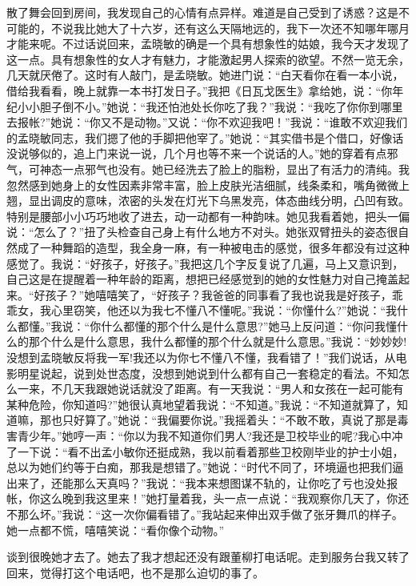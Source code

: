 \documentclass[12pt,oneside]{book}
\begin{document}
散了舞会回到房间，我发现自己的心情有点异样。难道是自己受到了诱惑？这是不可能的，不说我比她大了十六岁，还有这么天隔地远的，我下一次还不知哪年哪月才能来呢。不过话说回来，孟晓敏的确是一个具有想象性的姑娘，我今天才发现了这一点。具有想象性的女人才有魅力，才能激起男人探索的欲望。不然一览无余，几天就厌倦了。这时有人敲门，是孟晓敏。她进门说：``白天看你在看一本小说，借给我看看，晚上就靠一本书打发日子。''我把《日瓦戈医生》拿给她，说：``你年纪小小胆子倒不小。''她说：``我还怕池处长你吃了我？''我说：``我吃了你你到哪里去报帐?''她说：``你又不是动物。''又说：``你不欢迎我吧！''我说：``谁敢不欢迎我们的孟晓敏同志，我们摁了他的手脚把他宰了。''她说：``其实借书是个借口，好像话没说够似的，追上门来说一说，几个月也等不来一个说话的人。''她的穿着有点邪气，可神态一点邪气也没有。她已经洗去了脸上的脂粉，显出了有活力的清纯。我忽然感到她身上的女性因素非常丰富，脸上皮肤光洁细腻，线条柔和，嘴角微微上翘，显出调皮的意味，浓密的头发在灯光下乌黑发亮，体态曲线分明，凸凹有致。特别是腰部小小巧巧地收了进去，动一动都有一种韵味。她见我看着她，把头一偏说：``怎么了？''扭了头检查自己身上有什么地方不对头。她张双臂扭头的姿态很自然成了一种舞蹈的造型，我全身一麻，有一种被电击的感觉，很多年都没有过这种感觉了。我说：``好孩子，好孩子。''我把这几个字反复说了几遍，马上又意识到，自己这是在提醒着一种年龄的距离，想把已经感觉到的她的女性魅力对自己掩盖起来。``好孩子？''她嘻嘻笑了，``好孩子？我爸爸的同事看了我也说我是好孩子，乖乖女，我心里窃笑，他还以为我七不懂八不懂呢。''我说：``你懂什么?''她说：``我什么都懂。''我说：``你什么都懂的那个什么是什么意思?''她马上反问道：``你问我懂什么的那个什么是什么意思，我什么都懂的那个什么就是什么意思。''我说：``妙妙妙!没想到孟晓敏反将我一军!我还以为你七不懂八不懂，我看错了！''我们说话，从电影明星说起，说到处世态度，没想到她说到什么都有自己一套稳定的看法。不知怎么一来，不几天我跟她说话就没了距离。有一天我说：``男人和女孩在一起可能有某种危险，你知道吗?''她很认真地望着我说：``不知道。''我说：``不知道就算了，知道嘛，那也只好算了。''她说：``我偏要你说。''我摇着头：``不敢不敢，真说了那是毒害青少年。''她哼一声：``你以为我不知道你们男人?我还是卫校毕业的呢?我心中冲了一下说：``看不出孟小敏你还挺成熟，我以前看着那些卫校刚毕业的护士小姐，总以为她们约等于白痴，那我是想错了。''她说：``时代不同了，环境逼也把我们逼出来了，还能那么天真吗？''我说：``我本来想图谋不轨的，让你吃了亏也没处报帐，你这么晚到我这里来！''她打量着我，头一点一点说：``我观察你几天了，你还不那么坏。''我说：``这一次你偏看错了。''我站起来伸出双手做了张牙舞爪的样子。她一点都不慌，嘻嘻笑说：``看你像个动物。''

谈到很晚她才去了。她去了我才想起还没有跟董柳打电话呢。走到服务台我又转了回来，觉得打这个电话吧，也不是那么迫切的事了。
\end{document}
